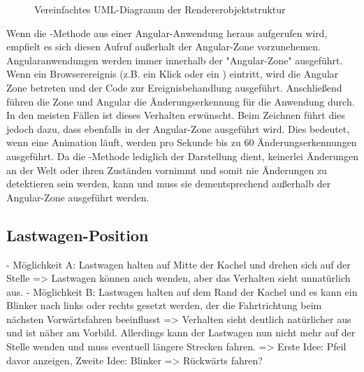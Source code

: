 \begin{figure}[h]
  \caption{Vereinfachtes UML-Diagramm der Rendererobjektstruktur}
  \label{fig:implementation:rendering:uml}
\end{figure}

Wenn die -Methode aus einer Angular-Anwendung heraus aufgerufen wird, empfielt es sich diesen Aufruf außerhalt der Angular-Zone vorzunehemen. Angularanwendungen werden immer innerhalb der "Angular-Zone" ausgeführt. Wenn ein Browserereignis (z.B. ein Klick oder ein ) eintritt, wird die Angular Zone betreten und der Code zur Ereignisbehandlung ausgeführt. Anschließend führen die Zone und Angular die Änderungserkennung für die Anwendung durch. In den meisten Fällen ist dieses Verhalten erwünscht. Beim Zeichnen führt dies jedoch dazu, dass  ebenfalls in der Angular-Zone ausgeführt wird. Dies bedeutet, wenn eine Animation läuft, werden pro Sekunde bis zu 60 Änderungserkennungen ausgeführt. \cite{angular-canvas} Da die -Methode lediglich der Darstellung dient, keinerlei Änderungen an der Welt oder ihren Zuständen vornimmt und somit nie Änderungen zu detektieren sein werden, kann und muss sie dementsprechend außerhalb der Angular-Zone ausgeführt werden.

\subsection{Lastwagen-Position}

- Möglichkeit A: Lastwagen halten auf Mitte der Kachel und drehen sich auf der
                 Stelle => Lastwagen können auch wenden, aber das Verhalten
                 sieht unnatürlich aus.
- Möglichkeit B: Lastwagen halten auf dem Rand der Kachel und es kann ein
                 Blinker nach links oder rechts gesetzt werden, der die
                 Fahrtrichtung beim nächsten Vorwärtsfahren beeinflusst
                 => Verhalten sieht deutlich natürlicher aus und ist näher am
                 Vorbild. Allerdings kann der Lastwagen nun nicht mehr auf der
                 Stelle wenden und muss eventuell längere Strecken fahren.
                 => Erste Idee: Pfeil davor anzeigen, Zweite Idee: Blinker
                 => Rückwärts fahren?


